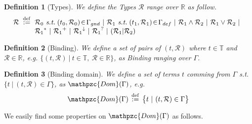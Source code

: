\documentclass[12pt]{article}
\newtheorem{Definition}{Definition}[section]
\begin{document}
\begin{Definition}[Types]
  We define the Types $\mathcal{R}$ range over $\mathbb{R}$ as follow.
  \[ \mathcal{R} \;\stackrel{\mathrm{def}}{:=}\!
  \begin{array}[t]{l}
    \mathcal{R}_0 \ \text{\it s.t.}\; (t_0, \mathcal{R}_0) \!\in\!
     \Gamma_{gnd}\ |\ 
    \mathcal{R}_1\ \text{\it s.t.}\; (t_1, \mathcal{R}_1) \!\in\!
     \Gamma_{def}\ |\
    \mathcal{R}_1 \wedge \mathcal{R}_2 \ |\
     \mathcal{R}_1 \vee \mathcal{R}_2 \ |  \\
    {\mathcal{R}_1}^* \ |\ {\mathcal{R}_1}^+ \ |\
    {\mathcal{R}_1}^\downarrow \ |\ {\mathcal{R}_1}^? \ |\
    (\mathcal{R}_1 | \mathcal{R}_2)
  \end{array}
  \]
\end{Definition}


\begin{Definition}[Binding]
  We define a set of pairs of $(t, \mathcal{R})$ where
  $t \in \mathbb{T}$ and $\mathcal{R} \in \mathbb{R}$, e.g.
  $\bigl\{(t, \mathcal{R}) \ |\ t \in \mathbb{T},\
  \mathcal{R} \in \mathbb{R} \bigr\}$, as Binding ranging over $\Gamma$.
\end{Definition}


\begin{Definition}[Binding domain]
  We define a set of terms $t$ comming from $\Gamma$ s.t.
  $\bigl\{ t \ |\ (t, \mathcal{R}) \in \Gamma \bigr\}$, as
  $\mathpzc{Dom}(\Gamma)$, e.g.
  \[ \mathpzc{Dom}(\Gamma) \,\stackrel{\mathrm{def}}{:=}\,
      \bigl\{ t \ |\ (t, \mathcal{R}) \in \Gamma \bigr\}
  \]
\end{Definition}


We easily find some properties on $\mathpzc{Dom}(\Gamma)$ as follows.
\end{document}
